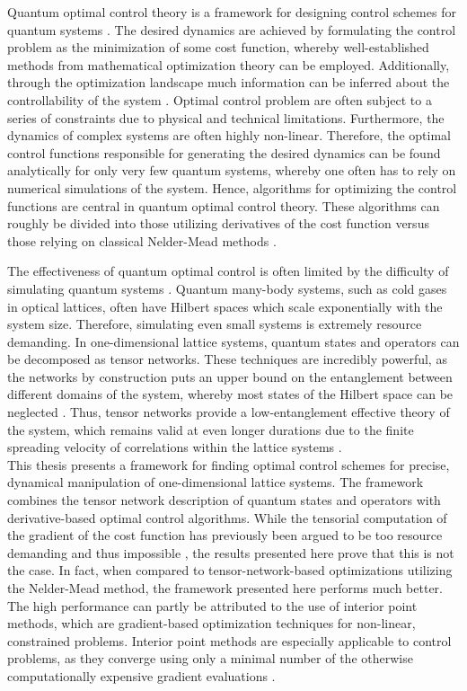 Quantum optimal control theory is a framework for designing control schemes for quantum systems \cite{Peirce1988,Werschnik2007}. The desired dynamics are achieved by formulating the control problem as the minimization of some cost function, whereby well-established methods from mathematical optimization theory can be employed. Additionally, through the optimization landscape much information can be inferred about the controllability of the system \cite{Rabitz2004}. Optimal control problem are often subject to a series of constraints due to physical and technical limitations. Furthermore, the dynamics of complex systems are often highly non-linear. Therefore, the optimal control functions responsible for generating the desired dynamics can be found analytically for only very few quantum systems, whereby one often has to rely on numerical simulations of the system. Hence, algorithms for optimizing the control functions are central in quantum optimal control theory. These algorithms can roughly be divided into those utilizing derivatives of the cost function \cite{Khaneja2005,Krotov1995} versus those relying on classical Nelder-Mead methods \cite{Doria2011}.

The effectiveness of quantum optimal control is often limited by the difficulty of simulating quantum systems \cite{Vidal2003}. Quantum many-body systems, such as cold gases in optical lattices, often have Hilbert spaces which scale exponentially with the system size. Therefore, simulating even small systems is extremely resource demanding. In one-dimensional lattice systems, quantum states and operators can be decomposed as tensor networks. These techniques are incredibly powerful, as the networks by construction puts an upper bound on the entanglement between different domains of the system, whereby most states of the Hilbert space can be neglected \cite{schollwock,Cramer}. Thus, tensor networks provide a low-entanglement effective theory of the system, which remains valid at even longer durations due to the finite spreading velocity of correlations within the lattice systems \cite{Bravyi2006,Eisert2006}.\\

This thesis presents a framework for finding optimal control schemes for precise, dynamical manipulation of one-dimensional lattice systems. The framework combines the tensor network description of quantum states and operators with derivative-based optimal control algorithms. While the tensorial computation of the gradient of the cost function has previously been argued to be too resource demanding and thus impossible \cite{Doria2011}, the results presented here prove that this is not the case. In fact, when compared to tensor-network-based optimizations utilizing the Nelder-Mead method, the framework presented here performs much better. The high performance can partly be attributed to the use of interior point methods, which are gradient-based optimization techniques for non-linear, constrained problems. Interior point methods are especially applicable to control problems, as they converge using only a minimal number of the otherwise computationally expensive gradient evaluations \cite{wright}.

